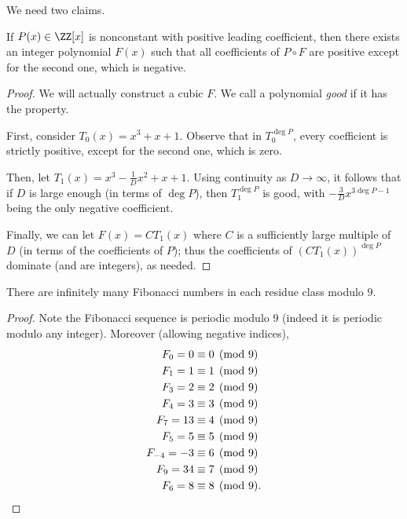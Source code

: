 \documentclass[11pt]{scrartcl}
\begin{document}
We need two claims.
\begin{claim*}
  If $P(x) \in \ZZ[x]$ is nonconstant with
  positive leading coefficient,
  then there exists an integer polynomial $F(x)$
  such that all coefficients of $P \circ F$
  are positive except for the second one, which is negative.
\end{claim*}
\begin{proof}
  We will actually construct a cubic $F$.
  We call a polynomial \emph{good} if it has the property.

  First, consider $T_0(x) = x^3+x+1$.
  Observe that in $T_0^{\deg P}$,
  every coefficient is strictly positive,
  except for the second one, which is zero.

  Then, let $T_1(x) = x^3 - \frac1D x^2 + x + 1$.
  Using continuity as $D \to \infty$,
  it follows that if $D$ is large enough (in terms of $\deg P$),
  then $T_1^{\deg P}$ is good,
  with $-\frac3D x^{3\deg P-1}$ being the only negative coefficient.

  Finally, we can let $F(x) = CT_1(x)$
  where $C$ is a sufficiently large multiple of $D$
  (in terms of the coefficients of $P$);
  thus the coefficients of $(CT_1(x))^{\deg P}$ dominate
  (and are integers), as needed.
\end{proof}
\begin{claim*}
  There are infinitely many Fibonacci numbers
  in each residue class modulo $9$.
\end{claim*}
\begin{proof}
  Note the Fibonacci sequence is periodic modulo $9$
  (indeed it is periodic modulo any integer).
  Moreover (allowing negative indices),
  \begin{align*}
    F_{0} = 0 &\equiv 0 \pmod 9 \\
    F_{1} = 1 &\equiv 1 \pmod 9 \\
    F_{3} = 2 &\equiv 2 \pmod 9 \\
    F_{4} = 3 &\equiv 3 \pmod 9 \\
    F_{7} = 13 &\equiv 4 \pmod 9 \\
    F_{5} = 5 &\equiv 5 \pmod 9 \\
    F_{-4} = -3 &\equiv 6 \pmod 9 \\
    F_{9} = 34 &\equiv 7 \pmod 9 \\
    F_{6} = 8 &\equiv 8 \pmod 9. \qedhere
  \end{align*}
\end{proof}
\end{document}
